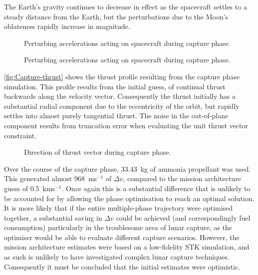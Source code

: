 The Earth's gravity continues to decrease in effect as the spacecraft settles to a steady distance from the Earth, but the perturbations due to the Moon's oblateness rapidly increase in magnitude. 

\begin{figure}
\centering
\def\svgwidth{\figurewidth}

\caption{Perturbing accelerations acting on spacecraft during capture phase.}
\label{fig:Capture-pert}
\end{figure}

\begin{figure}
\centering
\def\svgwidth{\figurewidth}

\caption{Perturbing accelerations acting on spacecraft during capture phase.}
\label{fig:Capture-pert2}
\end{figure}

\autoref{fig:Capture-thrust} shows the thrust profile resulting from the capture phase simulation. This profile results from the initial guess, of continual thrust backwards along the velocity vector. Consequently the thrust initially has a substantial radial component due to the eccentricity of the orbit, but rapidly settles into almost purely tangential thrust. The noise in the out-of-plane component results from truncation error when evaluating the unit thrust vector constraint.

\begin{figure}
\centering
\def\svgwidth{\figurewidth}

\caption{Direction of thrust vector during capture phase.}
\label{fig:Capture-thrust}
\end{figure}

Over the course of the capture phase, 33.43~kg of ammonia propellant was used. This generated almost 968~ms$^{-1}$ of $\Delta v$, compared to the mission architecture guess of 0.5~kms$^{-1}$. Once again this is a substantial difference that is unlikely to be accounted for by allowing the phase optimisation to reach an optimal solution. It is more likely that if the entire multiple-phase trajectory were optimised together, a substantial saving in $\Delta v$ could be achieved (and correspondingly fuel consumption) particularly in the troublesome area of lunar capture, as the optimiser would be able to evaluate different capture scenarios. However, the mission architecture estimates were based on a low-fidelity STK simulation, and as such is unlikely to have investigated complex lunar capture techniques. Consequently it must be concluded that the initial estimates were optimistic.


